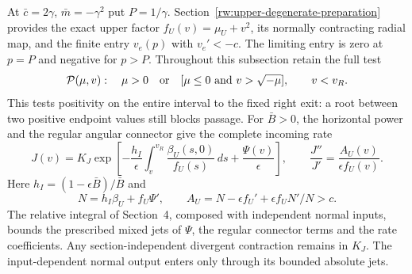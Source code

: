 At $\bar c=2\gamma$, $\bar m=-\gamma^2$ put $P=1/\gamma$.
Section~\ref{rw:upper-degenerate-preparation} provides the exact
upper factor $f_U(v)=\mu_U+v^2$, its normally contracting radial
map, and the finite entry $v_e(p)$ with $v_e'<-c$.
The limiting entry is zero at $p=P$ and negative for $p>P$.
Throughout this subsection retain the full test
\begin{equation}\label{rw:infinity:quadratic-test}
 \mathcal P(\mu,v):\quad
 \mu>0\quad\hbox{or}\quad[\mu\le0\hbox{ and }v>\sqrt{-\mu}],
 \qquad v<v_R.
\end{equation}
This tests positivity on the entire interval to the fixed right exit:
a root between two positive endpoint values still blocks passage.
For $\bar B>0$, the horizontal power and the regular angular
connector give the complete incoming rate
\begin{equation}\label{rw:infinity:repeated-rate}
 J(v)=K_J\exp\left[-\frac{h_I}{\epsilon}
         \int_v^{v_R}\frac{\beta_U(s,0)}{f_U(s)}\,ds
                      +\frac{\Psi(v)}\epsilon\right],\qquad
 \frac{J''}{J'}=\frac{A_U(v)}{\epsilon f_U(v)}.
\end{equation}
Here $h_I=(1-\epsilon\bar B)/\bar B$ and
\[
 N=h_I\beta_U+f_U\Psi',\qquad
 A_U=N-\epsilon f_U'+\epsilon f_UN'/N>c.
\]
The relative integral of Section~4, composed with independent normal
inputs, bounds the prescribed mixed jets of $\Psi$, the regular
connector terms and the rate coefficients. Any section-independent
divergent contraction remains in $K_J$. The input-dependent normal
output enters only through its bounded absolute jets.

